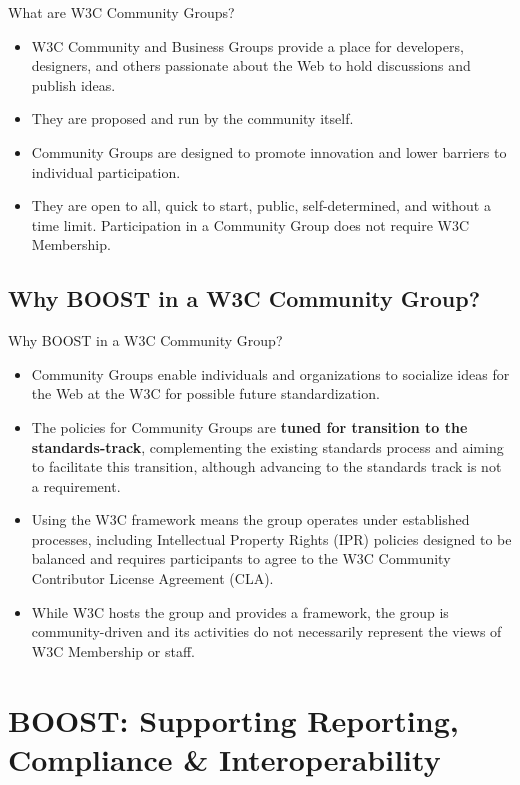 \documentclass[presentation]{beamer}
\begin{document}
\begin{frame}{What are W3C Community Groups?}
\begin{itemize}
\item W3C Community and Business Groups provide a place for developers, designers, and others passionate about the Web to hold discussions and publish ideas.
\item They are proposed and run by the community itself.
\item Community Groups are designed to promote innovation and lower barriers to individual participation.
\item They are open to all, quick to start, public, self-determined, and without a time limit. Participation in a Community Group does not require W3C Membership.
\end{itemize}
\end{frame}

\subsection{Why BOOST in a W3C Community Group?}
\label{sec:why-w3c}

\begin{frame}{Why BOOST in a W3C Community Group?}
\begin{itemize}
\item Community Groups enable individuals and organizations to socialize ideas for the Web at the W3C for possible future standardization.
\item The policies for Community Groups are \textbf{tuned for transition to the standards-track}, complementing the existing standards process and aiming to facilitate this transition, although advancing to the standards track is not a requirement.
\item Using the W3C framework means the group operates under established processes, including Intellectual Property Rights (IPR) policies designed to be balanced and requires participants to agree to the W3C Community Contributor License Agreement (CLA).
\item While W3C hosts the group and provides a framework, the group is community-driven and its activities do not necessarily represent the views of W3C Membership or staff.
\end{itemize}
\end{frame}

\section{BOOST: Supporting Reporting, Compliance \& Interoperability}
\label{sec:supporting}
\end{document}
